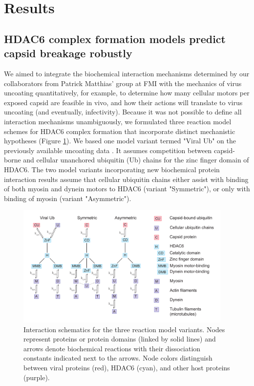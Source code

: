 \section{Results}

\subsection{HDAC6 complex formation models predict capsid breakage robustly}

We aimed to integrate the biochemical interaction mechanisms determined by our collaborators from Patrick Matthias' group at FMI with the mechanics of virus uncoating quantitatively, for example, to determine how many cellular motors per exposed capsid are feasible in vivo, and how their actions will translate to virus uncoating (and eventually, infectivity). Because it was not possible to define all interaction mechanisms unambiguously, we formulated three reaction model schemes for HDAC6 complex formation that incorporate distinct mechanistic hypotheses (Figure \ref{figure:ReactionModelSchemes}). We based one model variant termed "Viral Ub" on the previously available uncoating data \cite{banerjee2014influenza}. It assumes competition between capsid-borne and cellular unanchored ubiquitin (Ub) chains for the zinc finger domain of HDAC6. The two model variants incorporating new biochemical protein interaction results assume that cellular ubiquitin chains either assist with binding of both myosin and dynein motors to HDAC6 (variant "Symmetric"), or only with binding of myosin (variant "Asymmetric").

\begin{figure}
\begin{center}
\includegraphics[width=0.95\textwidth, trim={0cm 0cm 0cm 0cm}, clip]{D_chapters/2_ReactionModel/ReactionModels.pdf}
\caption[Interaction schematics for the three reaction model variants]%
{Interaction schematics for the three reaction model variants. Nodes represent proteins or protein domains (linked by solid lines) and arrows denote biochemical reactions with their dissociation constants indicated next to the arrows. Node colors distinguish between viral proteins (red), HDAC6 (cyan), and other host proteins (purple).}
\label{figure:ReactionModelSchemes}
\end{center}
\end{figure}

